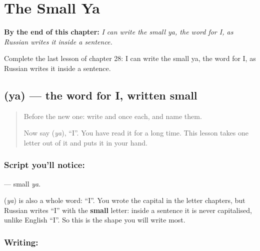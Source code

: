 
\chapter{The Small Ya}
\label{ch:ru-small-ya}

\begin{chapteropening}
\textbf{By the end of this chapter:} \emph{I can write the small ya, the word for I, as Russian writes it inside a sentence.}

Complete the last lesson of chapter 28: I can write the small ya, the word for I, as Russian writes it inside a sentence.
\end{chapteropening}

\section[\texorpdfstring{\ru{я} (ya)}{я (ya)}]{ (ya) — the word for I, written small}

\label{lesson:RU-W28-ya-small}



\begin{quote}
Before the new one: write  and  once each, and name them.

Now say \textbf{} (\emph{ya}), \textquotedblleft{}I\textquotedblright{}. You have read it for a long time. This lesson takes one letter out of it and puts it in your hand.
\end{quote}

\subsection*{Script you'll notice: }
\textbf{} — small \emph{ya}.

\textbf{} (\emph{ya}) is also a whole word: \textquotedblleft{}I\textquotedblright{}. You wrote the capital \textbf{} in the letter chapters, but Russian writes \textquotedblleft{}I\textquotedblright{} with the \textbf{small} letter: inside a sentence it is never capitalised, unlike English \textquotedblleft{}I\textquotedblright{}. So this is the shape you will write most.

\subsection*{Writing: }

